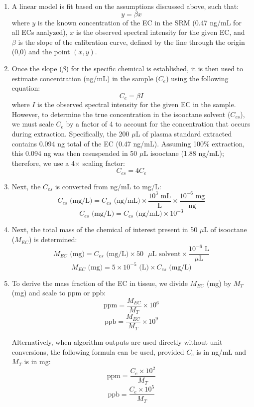 \documentclass[
]{article}
\begin{document}
\begin{enumerate}
\item A linear model is fit based on the assumptions discussed above, such that:
\[ y = \beta x \]
where $y$ is the known concentration of the EC in the SRM (0.47 ng/mL for all ECs analyzed), $x$ is the observed spectral intensity for the given EC, and $\beta$ is the slope of the calibration curve, defined by the line through the origin (0,0) and the point $(x,y)$.

\item Once the slope ($\beta$) for the specific chemical is established, it is then used to estimate concentration (ng/mL) in the sample ($C_e$) using the following equation:
\[ C_e = \beta I \]
where $I$ is the observed spectral intensity for the given EC in the sample. However, to determine the true concentration in the isooctane solvent ($C_{es}$), we must scale $C_e$ by a factor of 4 to account for the concentration that occurs during extraction. Specifically, the 200 $\mu$L of plasma standard extracted contains 0.094 ng total of the EC (0.47 ng/mL). Assuming 100\% extraction, this 0.094 ng was then resuspended in 50 $\mu$L isooctane (1.88 ng/mL); therefore, we use a 4$\times$ scaling factor:
\[ C_{es} = 4 C_e \]

\item Next, the $C_{es}$ is converted from ng/mL to mg/L:
\[ C_{es} \text{ (mg/L)} = C_{es} \text{ (ng/mL)} \times \frac{10^{3} \text{ mL}}{\text{L}} \times \frac{10^{-6} \text{ mg}}{\text{ng}} \]
\[ C_{es} \text{ (mg/L)} = C_{es} \text{ (ng/mL)} \times 10^{-3} \]

\item Next, the total mass of the chemical of interest present in 50 $\mu$L of isooctane ($M_{EC}$) is determined:
\[ M_{EC} \text{ (mg)} = C_{es} \text{ (mg/L)} \times 50 \text{ } \mu\text{L solvent} \times \frac{10^{-6} \text{ L}}{\mu\text{L}} \]
\[ M_{EC} \text{ (mg)} = 5 \times 10^{-5} \text{ (L)} \times C_{es} \text{ (mg/L)} \]

\item To derive the mass fraction of the EC in tissue, we divide $M_{EC}$ (mg) by $M_T$ (mg) and scale to ppm or ppb:
\[ \text{ppm} = \frac{M_{EC}}{M_T} \times 10^{6} \]
\[ \text{ppb} = \frac{M_{EC}}{M_T} \times 10^{9} \]

\noindent Alternatively, when algorithm outputs are used directly without unit conversions, the following formula can be used, provided $C_e$ is in ng/mL and $M_T$ is in mg:
\[ \text{ppm} = \frac{C_e \times 10^{2}}{M_T} \]
\[ \text{ppb} = \frac{C_e \times 10^{5}}{M_T} \]
\end{enumerate}
\end{document}
